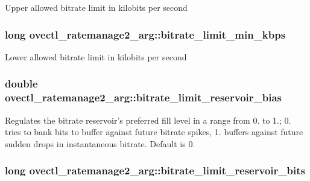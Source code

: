 Upper allowed bitrate limit in kilobits per second \hypertarget{structovectl__ratemanage2__arg_aeb53a17fff14ec50d143602adfdeabeb}{
\subsubsection[{bitrate\+\_\+limit\+\_\+min\+\_\+kbps}]{\setlength{\rightskip}{0pt plus 5cm}long ovectl\+\_\+ratemanage2\+\_\+arg\+::bitrate\+\_\+limit\+\_\+min\+\_\+kbps}}\label{structovectl__ratemanage2__arg_aeb53a17fff14ec50d143602adfdeabeb}
Lower allowed bitrate limit in kilobits per second \hypertarget{structovectl__ratemanage2__arg_a5567fde1798b1e80e40a77565b4b44f4}{
\subsubsection[{bitrate\+\_\+limit\+\_\+reservoir\+\_\+bias}]{\setlength{\rightskip}{0pt plus 5cm}double ovectl\+\_\+ratemanage2\+\_\+arg\+::bitrate\+\_\+limit\+\_\+reservoir\+\_\+bias}}\label{structovectl__ratemanage2__arg_a5567fde1798b1e80e40a77565b4b44f4}
Regulates the bitrate reservoir's preferred fill level in a range from 0. to 1.; 0. tries to bank bits to buffer against future bitrate spikes, 1. buffers against future sudden drops in instantaneous bitrate. Default is 0. \hypertarget{structovectl__ratemanage2__arg_a75e496acac882e156137de9d1200ebd7}{
\subsubsection[{bitrate\+\_\+limit\+\_\+reservoir\+\_\+bits}]{\setlength{\rightskip}{0pt plus 5cm}long ovectl\+\_\+ratemanage2\+\_\+arg\+::bitrate\+\_\+limit\+\_\+reservoir\+\_\+bits}}\label{structovectl__ratemanage2__arg_a75e496acac882e156137de9d1200ebd7}
